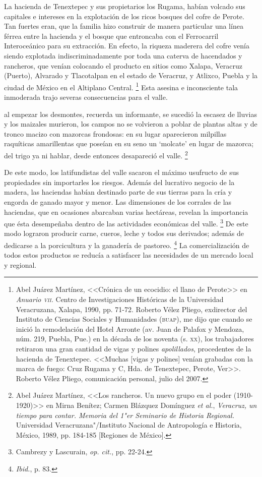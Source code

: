 \documentclass[14pt,twoside,final]{extbook} %
\let\oldfootnote\footnote
\renewcommand\footnote[1]{%
\oldfootnote{\hspace{1mm}#1}}
\begin{document}
La hacienda de Tenextepec y sus propietarios los Rugama, habían volcado sus capitales e intereses en la explotación de los ricos bosques del cofre de Perote. Tan fuertes eran, que la familia hizo construir de manera particular una línea férrea entre la hacienda y el bosque que entroncaba con el Ferrocarril Interoceánico para su extracción. En efecto, la riqueza maderera del cofre venía siendo explotada indiscriminadamente por toda una caterva de hacendados y rancheros, que venían colocando el producto en sitios como Xalapa, Veracruz (Puerto), Alvarado y Tlacotalpan en el estado de Veracruz,
y Atlixco, Puebla y la ciudad de México en el Altiplano Central.\footnote{Abel Juárez Martínez, <<Crónica de un ecocidio: el llano de Perote>> en \textit{Anuario \textsc{vii}.} Centro de Investigaciones Históricas de la Universidad Veracruzana, Xalapa, 1990, pp. 71-72. Roberto Vélez Pliego, exdirector del Instituto de Ciencias Sociales y Humanidades (\textsc{buap}), me dijo que cuando se inició la remodelación del Hotel Arronte (av. Juan de Palafox y Mendoza, núm. 219, Puebla, Pue.) en la década de los noventa (s. \textsc{xx}), los trabajadores retiraron una gran cantidad de vigas y polines \emph{apolillados}, procedentes de la hacienda de Tenextepec. <<Muchas [vigas y polines] venían grabadas con la marca de fuego: Cruz Rugama y C\textsu{ia}, Hda. de Tenextepec, Perote, Ver>>. Roberto Vélez Pliego, comunicación personal, julio del 2007.} Esta asesina e inconsciente tala inmoderada trajo severas consecuencias para el valle.
\begin{quoting}
al empezar los desmontes, recuerda un informante, se sucedió la escasez de lluvias y los maizales murieron, los campos no se volvieron a poblar de plantas altas y de tronco macizo con mazorcas frondosas: en su lugar aparecieron milpillas raquíticas amarillentas que poseían en su seno un
`molcate' en lugar de mazorca; del trigo ya ni hablar, desde entonces desapareció el valle.\footnote{Abel Juárez Martínez, <<Los rancheros. Un nuevo grupo en el poder (1910-1920)>> en Mirna Benítez; Carmen Blázquez Domínguez \emph{et al.}, \emph{Veracruz, un tiempo para contar. Memoria del 1"er Seminario de Historia Regional.} Universidad Veracruzana"/Instituto Nacional de Antropología e Historia, México, 1989, pp. 184-185 [Regiones de México].}
\end{quoting}
De este modo, los latifundistas del valle sacaron el máximo usufructo de sus propiedades sin importarles los riesgos. Además del lucrativo negocio de la madera, las haciendas habían destinado parte de sus tierras para la cría y engorda de ganado mayor y menor. Las dimensiones de los corrales de las haciendas, que en ocasiones abarcaban varias hectáreas, revelan la importancia que ésta desempeñaba dentro de las actividades económicas del valle.\footnote{Cambrezy y Lascurain, \emph{op. cit.}, pp. 22-24.} De este modo lograron producir carne, cueros, leche y todos sus derivados; además de dedicarse a la porcicultura y la ganadería de pastoreo.\footnote{\emph{Ibid.}, p. 83.} La comercialización de todos estos productos se reducía a satisfacer las necesidades de un mercado local y regional.
\end{document}
